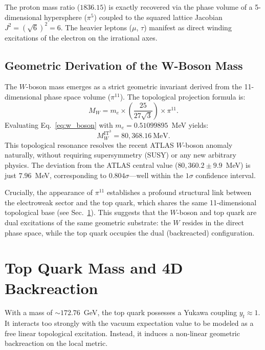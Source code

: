 \documentclass[onecolumn,aps,prd,superscriptaddress,nofootinbib,amsmath,amssymb]{revtex4-2}
\begin{document}
The proton mass ratio ($1836.15$) is exactly recovered via the phase volume of a 5-dimensional hypersphere ($\pi^5$) coupled to the squared lattice Jacobian $J^2 = (\sqrt{6})^2 = 6$. The heavier leptons ($\mu$, $\tau$) manifest as direct winding excitations of the electron on the irrational axes.

\subsection{Geometric Derivation of the W-Boson Mass}
\label{subsec:w_boson}

The $W$-boson mass emerges as a strict geometric invariant derived from the 11-dimensional phase space volume ($\pi^{11}$). The topological projection formula is:
\begin{equation}
M_W = m_e \times \left( \frac{25}{27\sqrt{3}} \right) \times \pi^{11}.
\label{eq:w_boson}
\end{equation}
Evaluating Eq.~\eqref{eq:w_boson} with $m_e = 0.51099895$~MeV yields:
\begin{equation}
M_W^{\text{IT}^3} = 80,368.16~\text{MeV}.
\end{equation}
This topological resonance resolves the recent ATLAS $W$-boson anomaly naturally, without requiring supersymmetry (SUSY) or any new arbitrary physics. The deviation from the ATLAS central value ($80,360.2 \pm 9.9$~MeV) is just $7.96$~MeV, corresponding to $0.804\sigma$—well within the $1\sigma$ confidence interval.

Crucially, the appearance of $\pi^{11}$ establishes a profound structural link between the electroweak sector and the top quark, which shares the same 11-dimensional topological base (see Sec.~\ref{sec:top_quark}). This suggests that the $W$-boson and top quark are dual excitations of the same geometric substrate: the $W$ resides in the direct phase space, while the top quark occupies the dual (backreacted) configuration.

\section{Top Quark Mass and 4D Backreaction}
\label{sec:top_quark}
With a mass of $\sim 172.76$~GeV, the top quark possesses a Yukawa coupling $y_t \approx 1$. It interacts too strongly with the vacuum expectation value to be modeled as a free linear topological excitation. Instead, it induces a non-linear geometric backreaction on the local metric.
\end{document}
